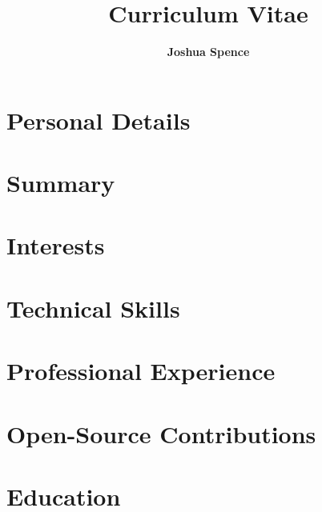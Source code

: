 \documentclass{article}
\title{\Huge{\textbf{Curriculum Vitae}}}
\author{\Large{\textbf{Joshua Spence}}}
\date{}
\newcommand{\cvsection}[2]{%
  \section*{#1}%
}
\begin{document}
\maketitle

\cvsection{Personal Details}{personal}
\cvsection{Summary}{summary}
\cvsection{Interests}{interests}
\cvsection{Technical Skills}{skills}
\cvsection{Professional Experience}{experience}
\cvsection{Open-Source Contributions}{oss}
\cvsection{Education}{education}
\end{document}
